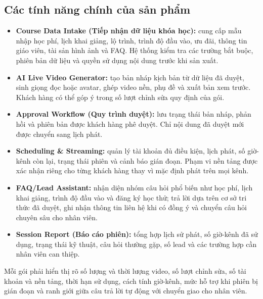 \subsection{Các tính năng chính của sản phẩm}

\begin{itemize}
    \item \textbf{Course Data Intake (Tiếp nhận dữ liệu khóa học):} cung cấp mẫu
    nhập học phí, lịch khai giảng, lộ trình, trình độ đầu vào, ưu đãi, thông tin
    giáo viên, tài sản hình ảnh và FAQ. Hệ thống kiểm tra các trường bắt buộc,
    phiên bản dữ liệu và quyền sử dụng nội dung trước khi sản xuất.
    \item \textbf{AI Live Video Generator:} tạo bản nháp kịch bản từ dữ liệu đã
    duyệt, sinh giọng đọc hoặc avatar, ghép video nền, phụ đề và xuất bản xem
    trước. Khách hàng có thể góp ý trong số lượt chỉnh sửa quy định của gói.
    \item \textbf{Approval Workflow (Quy trình duyệt):} lưu trạng thái bản nháp,
    phản hồi và phiên bản được khách hàng phê duyệt. Chỉ nội dung đã duyệt mới
    được chuyển sang lịch phát.
    \item \textbf{Scheduling \& Streaming:} quản lý tài khoản đủ điều kiện, lịch
    phát, số giờ-kênh còn lại, trạng thái phiên và cảnh báo gián đoạn. Phạm vi nền
    tảng được xác nhận riêng cho từng khách hàng thay vì mặc định phát trên mọi
    kênh.
    \item \textbf{FAQ/Lead Assistant:} nhận diện nhóm câu hỏi phổ biến như học
    phí, lịch khai giảng, trình độ đầu vào và đăng ký học thử; trả lời dựa trên
    cơ sở tri thức đã duyệt, ghi nhận thông tin liên hệ khi có đồng ý và chuyển
    câu hỏi chuyên sâu cho nhân viên.
    \item \textbf{Session Report (Báo cáo phiên):} tổng hợp lịch sử phát, số
    giờ-kênh đã sử dụng, trạng thái kỹ thuật, câu hỏi thường gặp, số lead và các
    trường hợp cần nhân viên can thiệp.
\end{itemize}

Mỗi gói phải hiển thị rõ số lượng và thời lượng video, số lượt chỉnh sửa, số tài
khoản và nền tảng, thời hạn sử dụng, cách tính giờ-kênh, mức hỗ trợ khi phiên bị
gián đoạn và ranh giới giữa câu trả lời tự động với chuyển giao cho nhân viên.
